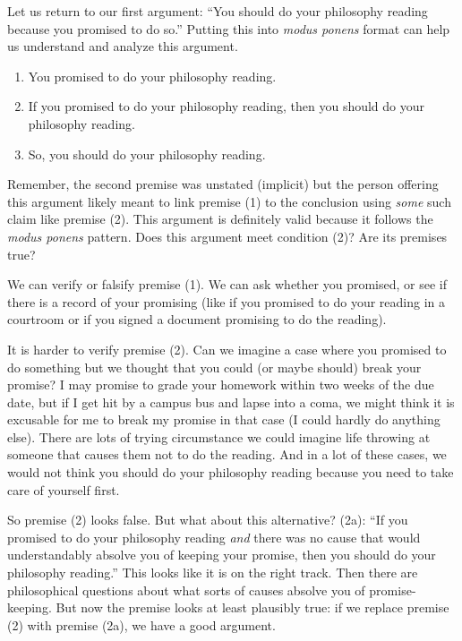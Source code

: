 \documentclass[oneside,letterpaper,12pt]{book}
\begin{document}
Let us return to our first argument: ``You should do your philosophy reading because you promised to do so.'' Putting this into \emph{modus ponens} format can help us understand and analyze this argument. 
\begin{enumerate}
	\item You promised to do your philosophy reading.
	\item If you promised to do your philosophy reading, then you should do your philosophy reading.
	\item So, you should do your philosophy reading.
\end{enumerate}
Remember, the second premise was unstated (implicit) but the person offering this argument likely meant to link premise (1) to the conclusion using \emph{some} such claim like premise (2). This argument is definitely valid because it follows the \emph{modus ponens} pattern. Does this argument meet condition (2)? Are its premises true?

We can verify or falsify premise (1). We can ask whether you promised, or see if there is a record of your promising (like if you promised to do your reading in a courtroom or if you signed a document promising to do the reading). 

It is harder to verify premise (2). Can we imagine a case where you promised to do something but we thought that you could (or maybe should) break your promise? I may promise to grade your homework within two weeks of the due date, but if I get hit by a campus bus and lapse into a coma, we might think it is excusable for me to break my promise in that case (I could hardly do anything else). There are lots of trying circumstance we could imagine life throwing at someone that causes them not to do the reading. And in a lot of these cases, we would not think you should do your philosophy reading because you need to take care of yourself first.

So premise (2) looks false. But what about this alternative? (2a): ``If you promised to do your philosophy reading \emph{and} there was no cause that would understandably absolve you of keeping your promise, then you should do your philosophy reading.'' This looks like it is on the right track. Then there are philosophical questions about what sorts of causes absolve you of promise-keeping. But now the premise looks at least plausibly true: if we replace premise (2) with premise (2a), we have a good argument.
\end{document}
